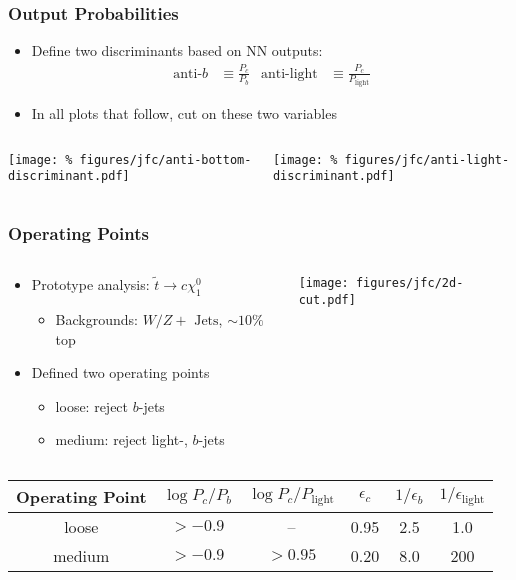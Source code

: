 \documentclass[usenames,dvipsnames]{beamer}
\newcommand{\link}[2]{\underline{\href{#2}{#1}}}
\begin{document}
\begin{frame}
  \frametitle{Output Probabilities}
  \begin{itemize}
  \item Define two discriminants based on NN outputs:
  \begin{align*}
    \text{anti-}b & \equiv \frac{P_c}{P_b} &
    \text{anti-light} & \equiv \frac{P_c}{P_{\text{light}}}
  \end{align*}
  \item In all plots that follow, cut on these two variables
  \end{itemize}
  \begin{columns}
    \begin{column}{0.5\textwidth}
      \texttt{[image: \%
figures/jfc/anti-bottom-discriminant.pdf]}
    \end{column}
    \begin{column}{0.5\textwidth}
      \texttt{[image: \%
figures/jfc/anti-light-discriminant.pdf]}
    \end{column}
  \end{columns}
\end{frame}

\begin{frame}
  \frametitle{Operating Points}
  \begin{columns}
    \begin{column}{0.5\textwidth}
      \begin{itemize}
      \item Prototype analysis: \link{$\tilde{t} \to c \chi_1^0$}{http://arxiv.org/abs/1407.0608}
        \begin{itemize}
        \item Backgrounds: $W/Z + \text{ Jets}$, $\sim 10\%$ top
        \end{itemize}
      \item Defined two operating points
        \begin{itemize}
        \item loose: reject $b$-jets
        \item medium: reject light-, $b$-jets
        \end{itemize}
      \end{itemize}
    \end{column}
    \begin{column}{0.5\textwidth}
      \texttt{[image: figures/jfc/2d-cut.pdf]}
    \end{column}
  \end{columns}
  \begin{tabular}{c|c c | c c c }
    Operating Point & $\log P_c / P_b$ & $\log P_c / P_{\text{light}}$ & $\epsilon_c$ & $1/\epsilon_b$ & $1/\epsilon_{\text{light}}$ \\ \hline
    loose & $> -0.9$ & -- & 0.95 & 2.5 & 1.0 \\
    medium & $> -0.9$ & $> 0.95$ & 0.20 & 8.0 & 200 \\
  \end{tabular}
\end{frame}
\end{document}
